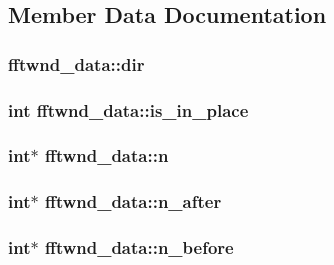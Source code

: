 \subsection{Member Data Documentation}
\hypertarget{structfftwnd__data_af6539f7692dda806b475e2601063155f}{
\subsubsection[{dir}]{ fftwnd\-\_\-data\-::dir}}\label{structfftwnd__data_af6539f7692dda806b475e2601063155f}
\hypertarget{structfftwnd__data_ad93f931868ab59241f4accb107a094a9}{
\subsubsection[{is\-\_\-in\-\_\-place}]{\setlength{\rightskip}{0pt plus 5cm}int fftwnd\-\_\-data\-::is\-\_\-in\-\_\-place}}\label{structfftwnd__data_ad93f931868ab59241f4accb107a094a9}
\hypertarget{structfftwnd__data_a3fa54e48b6012a8ad3075d261165e9ba}{
\subsubsection[{n}]{\setlength{\rightskip}{0pt plus 5cm}int$\ast$ fftwnd\-\_\-data\-::n}}\label{structfftwnd__data_a3fa54e48b6012a8ad3075d261165e9ba}
\hypertarget{structfftwnd__data_af2a9cac8bde7f13738a40e00a3536f6c}{
\subsubsection[{n\-\_\-after}]{\setlength{\rightskip}{0pt plus 5cm}int$\ast$ fftwnd\-\_\-data\-::n\-\_\-after}}\label{structfftwnd__data_af2a9cac8bde7f13738a40e00a3536f6c}
\hypertarget{structfftwnd__data_aaee96deb92bd226d350c5a57d6cd8ac6}{
\subsubsection[{n\-\_\-before}]{\setlength{\rightskip}{0pt plus 5cm}int$\ast$ fftwnd\-\_\-data\-::n\-\_\-before}}\label{structfftwnd__data_aaee96deb92bd226d350c5a57d6cd8ac6}
